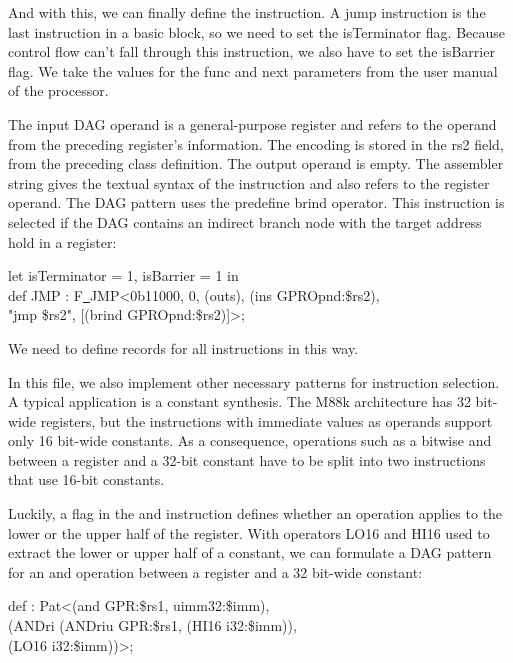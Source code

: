 And with this, we can finally define the instruction. A jump instruction is the last instruction in a basic block, so we need to set the isTerminator flag. Because control flow can't fall through this instruction, we also have to set the isBarrier flag. We take the values for the func and next parameters from the user manual of the processor.\par

The input DAG operand is a general-purpose register and refers to the operand from the preceding register's information. The encoding is stored in the rs2 field, from the preceding class definition. The output operand is empty. The assembler string gives the textual syntax of the instruction and also refers to the register operand. The DAG pattern uses the predefine brind operator. This instruction is selected if the DAG contains an indirect branch node with the target address hold in a register:\par

\begin{tcolorbox}[colback=white,colframe=black]
let isTerminator = 1, isBarrier = 1 in \\
\hspace*{1cm}def JMP : F\underline{~}JMP<0b11000, 0, (outs), (ins GPROpnd:\$rs2), \\
\hspace*{4cm}"jmp \$rs2", [(brind GPROpnd:\$rs2)]>;
\end{tcolorbox}

We need to define records for all instructions in this way.\par

In this file, we also implement other necessary patterns for instruction selection. A typical application is a constant synthesis. The M88k architecture has 32 bit-wide registers, but the instructions with immediate values as operands support only 16 bit-wide constants. As a consequence, operations such as a bitwise and between a register and a 32-bit constant have to be split into two instructions that use 16-bit constants.\par

Luckily, a flag in the and instruction defines whether an operation applies to the lower or the upper half of the register. With operators LO16 and HI16 used to extract the lower or upper half of a constant, we can formulate a DAG pattern for an and operation between a register and a 32 bit-wide constant:\par

\begin{tcolorbox}[colback=white,colframe=black]
def : Pat<(and GPR:\$rs1, uimm32:\$imm), \\
\hspace*{2cm}(ANDri (ANDriu GPR:\$rs1, (HI16 i32:\$imm)), \\
\hspace*{6cm}(LO16 i32:\$imm))>;
\end{tcolorbox}

